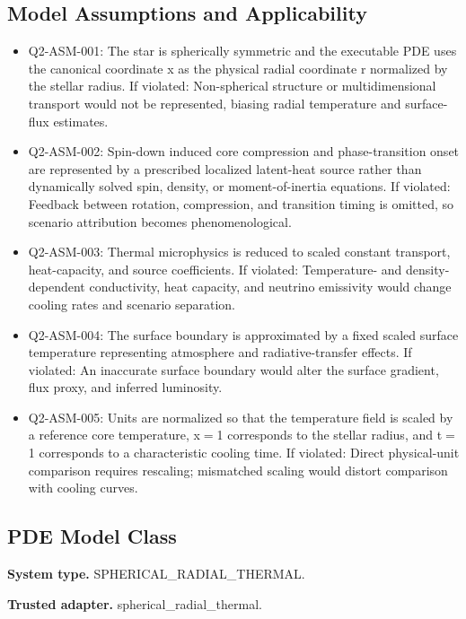 \documentclass[11pt]{article}
\begin{document}
\subsection{Model Assumptions and Applicability}

\begin{itemize}\raggedright
\item Q2-ASM-001: The star is spherically symmetric and the executable PDE uses the canonical coordinate x as the physical radial coordinate r normalized by the stellar radius. If violated: Non-spherical structure or multidimensional transport would not be represented, biasing radial temperature and surface-flux estimates.
\item Q2-ASM-002: Spin-down induced core compression and phase-transition onset are represented by a prescribed localized latent-heat source rather than dynamically solved spin, density, or moment-of-inertia equations. If violated: Feedback between rotation, compression, and transition timing is omitted, so scenario attribution becomes phenomenological.
\item Q2-ASM-003: Thermal microphysics is reduced to scaled constant transport, heat-capacity, and source coefficients. If violated: Temperature- and density-dependent conductivity, heat capacity, and neutrino emissivity would change cooling rates and scenario separation.
\item Q2-ASM-004: The surface boundary is approximated by a fixed scaled surface temperature representing atmosphere and radiative-transfer effects. If violated: An inaccurate surface boundary would alter the surface gradient, flux proxy, and inferred luminosity.
\item Q2-ASM-005: Units are normalized so that the temperature field is scaled by a reference core temperature, x\ensuremath{=}1 corresponds to the stellar radius, and t\ensuremath{=}1 corresponds to a characteristic cooling time. If violated: Direct physical-unit comparison requires rescaling; mismatched scaling would distort comparison with cooling curves.
\end{itemize}

\subsection{PDE Model Class}

\noindent\textbf{System type.} SPHERICAL\_RADIAL\_THERMAL.

\noindent\textbf{Trusted adapter.} spherical\_radial\_thermal.
\end{document}
